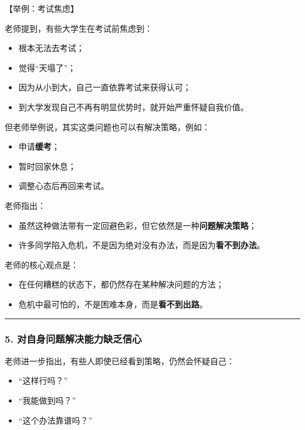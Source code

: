 \documentclass[
  chinese,
  9pt,
  a4paper,
]{ctexart}
\providecommand{\tightlist}{%
  \setlength{\itemsep}{0pt}\setlength{\parskip}{0pt}}
\begin{document}
【举例：考试焦虑】

老师提到，有些大学生在考试前焦虑到：

\begin{itemize}
\tightlist
\item
  根本无法去考试；
\item
  觉得``天塌了''；
\item
  因为从小到大，自己一直依靠考试来获得认可；
\item
  到大学发现自己不再有明显优势时，就开始严重怀疑自我价值。
\end{itemize}

但老师举例说，其实这类问题也可以有解决策略，例如：

\begin{itemize}
\tightlist
\item
  申请\textbf{缓考}；
\item
  暂时回家休息；
\item
  调整心态后再回来考试。
\end{itemize}

老师指出：

\begin{itemize}
\tightlist
\item
  虽然这种做法带有一定回避色彩，但它依然是一种\textbf{问题解决策略}；
\item
  许多同学陷入危机，不是因为绝对没有办法，而是因为\textbf{看不到办法}。
\end{itemize}

老师的核心观点是：

\begin{itemize}
\tightlist
\item
  在任何糟糕的状态下，都仍然存在某种解决问题的方法；
\item
  危机中最可怕的，不是困难本身，而是\textbf{看不到出路}。
\end{itemize}

\begin{center}\rule{0.5\linewidth}{0.5pt}\end{center}

\subsubsection{5.
对自身问题解决能力缺乏信心}\label{ux5bf9ux81eaux8eabux95eeux9898ux89e3ux51b3ux80fdux529bux7f3aux4e4fux4fe1ux5fc3}

老师进一步指出，有些人即使已经看到策略，仍然会怀疑自己：

\begin{itemize}
\tightlist
\item
  ``这样行吗？''
\item
  ``我能做到吗？''
\item
  ``这个办法靠谱吗？''
\end{itemize}
\end{document}
